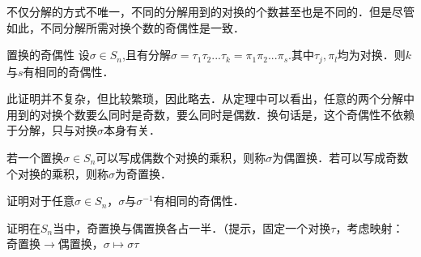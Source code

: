不仅分解的方式不唯一，不同的分解用到的对换的个数甚至也是不同的．但是尽管如此，不同分解所需对换个数的奇偶性是一致．

\begin{theorem}{置换的奇偶性}
设$\sigma\in S_n$,且有分解$\sigma=\tau_1\tau_2...\tau_k=\pi_1\pi_2...\pi_s$.其中$\tau_j, \pi_l$均为对换．则$k$与$s$有相同的奇偶性．
\end{theorem}
此证明并不复杂，但比较繁琐，因此略去．从定理中可以看出，任意的两个分解中用到的对换个数要么同时是奇数，要么同时是偶数．换句话是，这个奇偶性不依赖于分解，只与对换$\sigma$本身有关．

\begin{definition}{}
若一个置换$\sigma\in S_n$可以写成偶数个对换的乘积，则称$\sigma$为偶置换．若可以写成奇数个对换的乘积，则称$\sigma$为奇置换．
\end{definition}

\begin{exercise}{}
证明对于任意$\sigma\in S_n$，$\sigma$与$\sigma^{-1}$有相同的奇偶性．
\end{exercise}

\begin{exercise}{}
证明在$S_n$当中，奇置换与偶置换各占一半．（提示，固定一个对换$\tau$，考虑映射：奇置换$\to$偶置换，$\sigma\mapsto\sigma\tau$
\end{exercise}

